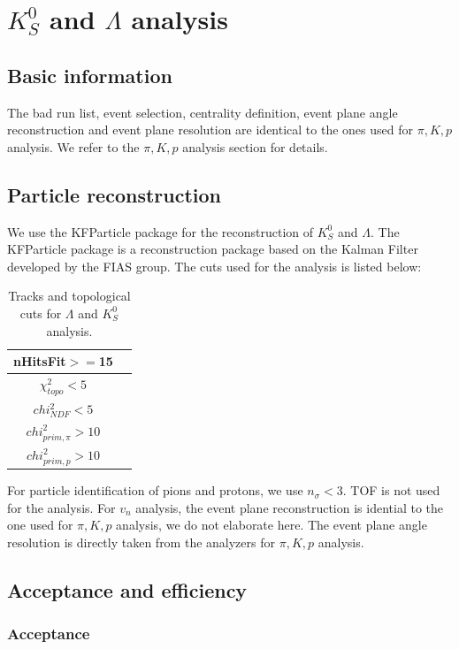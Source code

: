 \section{$K^0_S$ and $\Lambda$ analysis}

\subsection{Basic information}
The bad run list, event selection, centrality definition, event plane angle reconstruction and event plane resolution are identical to the ones used for $\pi,K,p$ analysis. We refer to the $\pi,K,p$ analysis section for details.

\subsection{Particle reconstruction}
We use the KFParticle package for the reconstruction of $K^0_S$ and $\Lambda$. The KFParticle package is a reconstruction package based on the Kalman Filter developed by the FIAS group. The cuts used for the analysis is listed below: 

\begin{table}[ht]
\caption{Tracks and topological cuts for $\Lambda$ and $K^0_S$ analysis.}
\label{tab:kfptcldkscuts}
\begin{tabular}{|c|c|}
\hline
nHitsFit$>=$15 \\ \hline
$\chi^{2}_{topo}<5$ \\ \hline
$chi^{2}_{NDF}<5$ \\ \hline
$chi^{2}_{prim,\pi}>10$ \\ \hline 
$chi^{2}_{prim,p}>10$ \\ \hline
\end{tabular}
\end{table}

For particle identification of pions and protons, we use $n_{\sigma}<3$. TOF is not used for the analysis. 
For $v_{n}$ analysis, the event plane reconstruction is idential to the one used for $\pi,K,p$ analysis, we do not elaborate here. The event plane angle resolution is directly taken from the analyzers for $\pi,K,p$ analysis. 

\subsection{Acceptance and efficiency}
\subsubsection{Acceptance}

